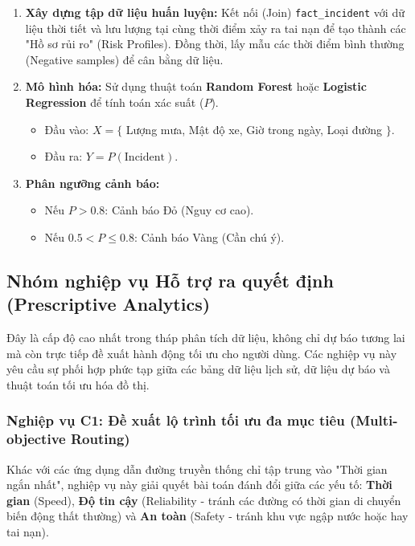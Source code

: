 \begin{enumerate}
    \item \textbf{Xây dựng tập dữ liệu huấn luyện:} Kết nối (Join) \texttt{fact\_incident} với dữ liệu thời tiết và lưu lượng tại cùng thời điểm xảy ra tai nạn để tạo thành các "Hồ sơ rủi ro" (Risk Profiles). Đồng thời, lấy mẫu các thời điểm bình thường (Negative samples) để cân bằng dữ liệu.
    \item \textbf{Mô hình hóa:} Sử dụng thuật toán \textbf{Random Forest} hoặc \textbf{Logistic Regression} để tính toán xác suất ($P$).
    \begin{itemize}
        \item Đầu vào: $X = \{$ Lượng mưa, Mật độ xe, Giờ trong ngày, Loại đường $\}$.
        \item Đầu ra: $Y = P(\text{Incident})$.
    \end{itemize}
    \item \textbf{Phân ngưỡng cảnh báo:}
    \begin{itemize}
        \item Nếu $P > 0.8$: Cảnh báo Đỏ (Nguy cơ cao).
        \item Nếu $0.5 < P \le 0.8$: Cảnh báo Vàng (Cần chú ý).
    \end{itemize}
\end{enumerate}



\subsection{Nhóm nghiệp vụ Hỗ trợ ra quyết định (Prescriptive Analytics)}

Đây là cấp độ cao nhất trong tháp phân tích dữ liệu, không chỉ dự báo tương lai mà còn trực tiếp đề xuất hành động tối ưu cho người dùng. Các nghiệp vụ này yêu cầu sự phối hợp phức tạp giữa các bảng dữ liệu lịch sử, dữ liệu dự báo và thuật toán tối ưu hóa đồ thị.

\subsubsection{Nghiệp vụ C1: Đề xuất lộ trình tối ưu đa mục tiêu (Multi-objective Routing)}

Khác với các ứng dụng dẫn đường truyền thống chỉ tập trung vào "Thời gian ngắn nhất", nghiệp vụ này giải quyết bài toán đánh đổi giữa các yếu tố: \textbf{Thời gian} (Speed), \textbf{Độ tin cậy} (Reliability - tránh các đường có thời gian di chuyển biến động thất thường) và \textbf{An toàn} (Safety - tránh khu vực ngập nước hoặc hay tai nạn).

